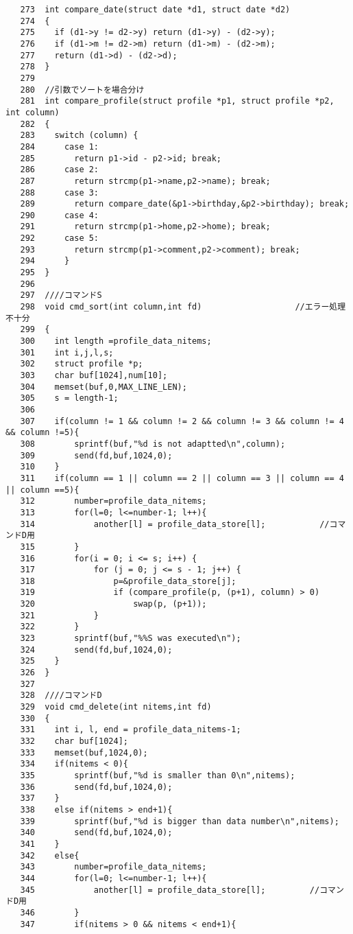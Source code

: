 \documentclass{jarticle}[11pt]
\begin{document}
\begin{verbatim}
   273	int compare_date(struct date *d1, struct date *d2)
   274	{
   275	  if (d1->y != d2->y) return (d1->y) - (d2->y);
   276	  if (d1->m != d2->m) return (d1->m) - (d2->m);
   277	  return (d1->d) - (d2->d);
   278	}
   279	
   280	//引数でソートを場合分け
   281	int compare_profile(struct profile *p1, struct profile *p2, int column)
   282	{
   283	  switch (column) {
   284	    case 1:
   285	      return p1->id - p2->id; break; 
   286	    case 2:
   287	      return strcmp(p1->name,p2->name); break;  
   288	    case 3:
   289	      return compare_date(&p1->birthday,&p2->birthday); break;  
   290	    case 4:
   291	      return strcmp(p1->home,p2->home); break;  
   292	    case 5:
   293	      return strcmp(p1->comment,p2->comment); break; 
   294	    }
   295	}
   296	
   297	////コマンドS
   298	void cmd_sort(int column,int fd)                   //エラー処理不十分
   299	{
   300	  int length =profile_data_nitems;
   301	  int i,j,l,s;
   302	  struct profile *p;
   303	  char buf[1024],num[10];
   304	  memset(buf,0,MAX_LINE_LEN);
   305	  s = length-1;
   306	
   307	  if(column != 1 && column != 2 && column != 3 && column != 4 && column !=5){
   308	      sprintf(buf,"%d is not adaptted\n",column);
   309	      send(fd,buf,1024,0);
   310	  } 
   311	  if(column == 1 || column == 2 || column == 3 || column == 4 || column ==5){
   312	      number=profile_data_nitems;
   313	      for(l=0; l<=number-1; l++){
   314	          another[l] = profile_data_store[l];           //コマンドD用
   315	      }
   316	      for(i = 0; i <= s; i++) {
   317	          for (j = 0; j <= s - 1; j++) {
   318	              p=&profile_data_store[j];
   319	              if (compare_profile(p, (p+1), column) > 0)
   320	                  swap(p, (p+1));  
   321	          }
   322	      }
   323	      sprintf(buf,"%%S was executed\n");
   324	      send(fd,buf,1024,0);
   325	  }
   326	}
   327	
   328	////コマンドD
   329	void cmd_delete(int nitems,int fd)
   330	{
   331	  int i, l, end = profile_data_nitems-1;
   332	  char buf[1024];
   333	  memset(buf,1024,0);
   334	  if(nitems < 0){
   335	      sprintf(buf,"%d is smaller than 0\n",nitems);
   336	      send(fd,buf,1024,0); 
   337	  } 
   338	  else if(nitems > end+1){
   339	      sprintf(buf,"%d is bigger than data number\n",nitems);
   340	      send(fd,buf,1024,0); 
   341	  }
   342	  else{
   343	      number=profile_data_nitems;
   344	      for(l=0; l<=number-1; l++){               
   345	          another[l] = profile_data_store[l];         //コマンドD用
   346	      }
   347	      if(nitems > 0 && nitems < end+1){

\end{verbatim}
\end{document}

